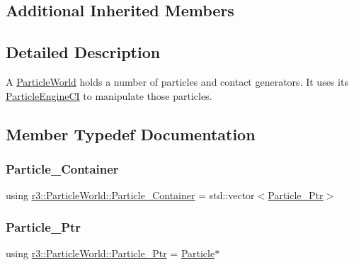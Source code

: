 \subsection*{Additional Inherited Members}


\subsection{Detailed Description}
A \mbox{\hyperlink{classr3_1_1_particle_world}{Particle\+World}} holds a number of particles and contact generators. It uses its \mbox{\hyperlink{classr3_1_1_particle_engine_c_i}{Particle\+Engine\+CI}} to manipulate those particles. 

\subsection{Member Typedef Documentation}
\mbox{\label{classr3_1_1_particle_world_aa354f6786c0837674fe8286f00465631}} 
\subsubsection{\texorpdfstring{Particle\+\_\+\+Container}{Particle\_Container}}
{\footnotesize\ttfamily using \mbox{\hyperlink{classr3_1_1_particle_world_aa354f6786c0837674fe8286f00465631}{r3\+::\+Particle\+World\+::\+Particle\+\_\+\+Container}} =  std\+::vector$<$\mbox{\hyperlink{classr3_1_1_particle_world_a12b4624a202a6b22629a3328f083ac81}{Particle\+\_\+\+Ptr}}$>$}

\mbox{\label{classr3_1_1_particle_world_a12b4624a202a6b22629a3328f083ac81}} 
\subsubsection{\texorpdfstring{Particle\+\_\+\+Ptr}{Particle\_Ptr}}
{\footnotesize\ttfamily using \mbox{\hyperlink{classr3_1_1_particle_world_a12b4624a202a6b22629a3328f083ac81}{r3\+::\+Particle\+World\+::\+Particle\+\_\+\+Ptr}} =  \mbox{\hyperlink{classr3_1_1_particle}{Particle}}$\ast$}



